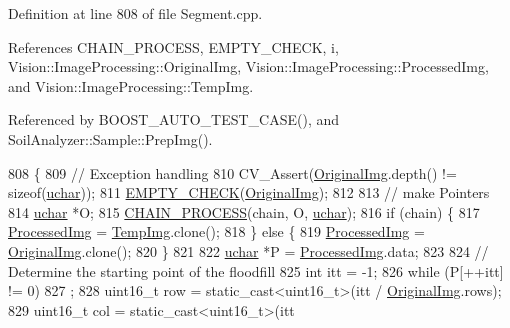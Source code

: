 Definition at line 808 of file Segment.\+cpp.



References C\+H\+A\+I\+N\+\_\+\+P\+R\+O\+C\+E\+S\+S, E\+M\+P\+T\+Y\+\_\+\+C\+H\+E\+C\+K, i, Vision\+::\+Image\+Processing\+::\+Original\+Img, Vision\+::\+Image\+Processing\+::\+Processed\+Img, and Vision\+::\+Image\+Processing\+::\+Temp\+Img.



Referenced by B\+O\+O\+S\+T\+\_\+\+A\+U\+T\+O\+\_\+\+T\+E\+S\+T\+\_\+\+C\+A\+S\+E(), and Soil\+Analyzer\+::\+Sample\+::\+Prep\+Img().


\begin{DoxyCode}
808                                   \{
809   \textcolor{comment}{// Exception handling}
810   CV\_Assert(\hyperlink{class_vision_1_1_image_processing_a77c370dab270158a4e9c634e2d3f48e7}{OriginalImg}.depth() != \textcolor{keyword}{sizeof}(\hyperlink{_soil_math_types_8h_a65f85814a8290f9797005d3b28e7e5fc}{uchar}));
811   \hyperlink{_image_processing_8h_a27c4e53b88a0f9f2c097add555131056}{EMPTY\_CHECK}(\hyperlink{class_vision_1_1_image_processing_a77c370dab270158a4e9c634e2d3f48e7}{OriginalImg});
812 
813   \textcolor{comment}{// make Pointers}
814   \hyperlink{_soil_math_types_8h_a65f85814a8290f9797005d3b28e7e5fc}{uchar} *O;
815   \hyperlink{_image_processing_8h_a6e6f0183cb53c76ef458d4fd34e07bcd}{CHAIN\_PROCESS}(chain, O, \hyperlink{_soil_math_types_8h_a65f85814a8290f9797005d3b28e7e5fc}{uchar});
816   \textcolor{keywordflow}{if} (chain) \{
817     \hyperlink{class_vision_1_1_image_processing_aa7d65742882cd1b2a1e4e9cb68809211}{ProcessedImg} = \hyperlink{class_vision_1_1_image_processing_a5371ad8d6f7aac9d43ee5c902ade7435}{TempImg}.clone();
818   \} \textcolor{keywordflow}{else} \{
819     \hyperlink{class_vision_1_1_image_processing_aa7d65742882cd1b2a1e4e9cb68809211}{ProcessedImg} = \hyperlink{class_vision_1_1_image_processing_a77c370dab270158a4e9c634e2d3f48e7}{OriginalImg}.clone();
820   \}
821 
822   \hyperlink{_soil_math_types_8h_a65f85814a8290f9797005d3b28e7e5fc}{uchar} *P = \hyperlink{class_vision_1_1_image_processing_aa7d65742882cd1b2a1e4e9cb68809211}{ProcessedImg}.data;
823 
824   \textcolor{comment}{// Determine the starting point of the floodfill}
825   \textcolor{keywordtype}{int} itt = -1;
826   \textcolor{keywordflow}{while} (P[++itt] != 0)
827     ;
828   uint16\_t row = \textcolor{keyword}{static\_cast<}uint16\_t\textcolor{keyword}{>}(itt / \hyperlink{class_vision_1_1_image_processing_a77c370dab270158a4e9c634e2d3f48e7}{OriginalImg}.rows);
829   uint16\_t col = \textcolor{keyword}{static\_cast<}uint16\_t\textcolor{keyword}{>}(itt %

\end{DoxyCode}
